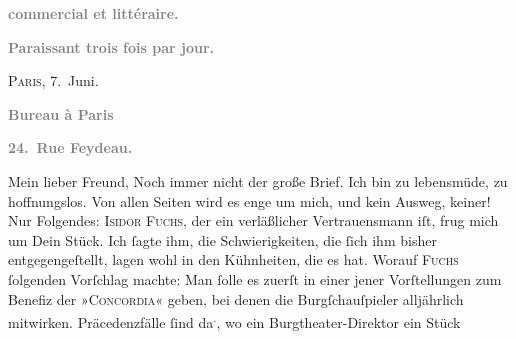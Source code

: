\begin{ledgroupsized}[t]{13cm}
           \pstart
           \begin{otherlanguage}{french}\textcolor{gray}{\textbf{commercial et littéraire.}}\end{otherlanguage}\pend
           \pstart
           \begin{otherlanguage}{french}\textcolor{gray}{\textbf{\textbf{Paraissant trois fois par jour.}}}\end{otherlanguage}\hfill \textsc{Paris}, 7. Juni.\pend
           \pstart
           \begin{otherlanguage}{french}\textcolor{gray}{\textbf{\textbf{Bureau à Paris}}}\end{otherlanguage}\pend
           \pstart
           \begin{otherlanguage}{french}\textcolor{gray}{\textbf{\textbf{24. Rue Feydeau.}}}\end{otherlanguage}\pend
           \pstart\center{}Mein lieber Freund,\pend\pstart
           Noch immer nicht der große Brief. Ich bin zu lebensmüde, zu hoffnungslos. Von allen
               Seiten wird es enge um mich, und kein Ausweg, keiner!\pend
           \pstart
           Nur Folgendes: \textsc{Isidor Fuchs}, der ein verläßlicher Vertrauensmann iſt, frug mich um Dein Stück. Ich ſagte ihm, die Schwierig{\pb}keiten, die ſich ihm bisher entgegengeſtellt, lagen
               wohl in den Kühnheiten, die es hat. Worauf \textsc{Fuchs} ſolgenden Vorſchlag machte: Man ſolle es zuerſt in einer jener Vorſtellungen
               zum Benefiz der »\textsc{Concordia}« geben, bei denen die Burgſchauſpieler alljährlich mitwirken. Präcedenzfälle ſind da\substVorne{}\textsuperscript{.}\substDazwischen{},\substHinten{} wo ein Burgtheater-Direktor ein Stück

\end{ledgroupsized}
